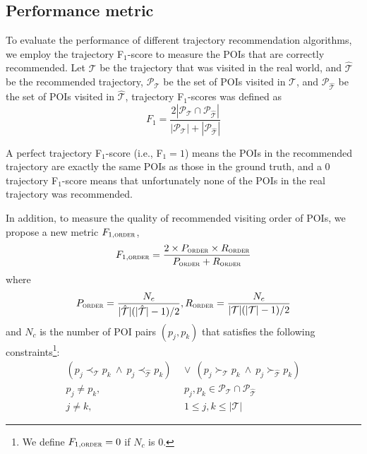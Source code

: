 \subsection{Performance metric}
\label{sec:metric}


To evaluate the performance of different trajectory recommendation algorithms,
we employ the trajectory F$_1$-score\cite{ijcai15} to measure the POIs that are
correctly recommended. Let $\mathcal{T}$ be the trajectory that was visited in the real world,
and $\hat{\mathcal{T}}$ be the recommended trajectory,
$\mathcal{P}_{\mathcal{T}}$ be the set of POIs visited in $\mathcal{T}$,
and $\mathcal{P}_{\hat{\mathcal{T}}}$ be the set of POIs visited in $\hat{\mathcal{T}}$,
trajectory F$_1$-scores was defined as
\begin{displaymath}
    F_1 = \frac{2 |\mathcal{P}_{\mathcal{T}} \cap \mathcal{P}_{\hat{\mathcal{T}}}|}
               {|\mathcal{P}_{\mathcal{T}}| + |\mathcal{P}_{\hat{\mathcal{T}}}|}
\end{displaymath}

A perfect trajectory F$_1$-score (i.e., F$_1 = 1$) means the POIs in the recommended trajectory are exactly
the same POIs as those in the ground truth, and a $0$ trajectory F$_1$-score means that unfortunately none of
the POIs in the real trajectory was recommended.

In addition, to measure the quality of recommended visiting order of POIs,
we propose a new metric $F_{1,\textsc{order}}$,
\begin{displaymath}
F_{1,\textsc{order}} = \frac{2 \times P_{\textsc{order}} \times R_{\textsc{order}}}
                           {P_{\textsc{order}} + R_{\textsc{order}}}
\end{displaymath}
where
\begin{displaymath}
P_{\textsc{order}} = \frac{N_c} {|\hat{\mathcal{T}}|(|\hat{\mathcal{T}}|-1) / 2},
R_{\textsc{order}} = \frac{N_c} {|\mathcal{T}|(|\mathcal{T}|-1) / 2}
\end{displaymath}
and $N_c$ is the number of POI pairs $(p_j, p_k)$ that satisfies the following
constraints\footnote{We define $F_{1,\textsc{order}}=0$ if $N_c$ is $0$.}:
\begin{align*}
    (p_j \prec_{\mathcal{T}} p_k ~\land~ p_j \prec_{\hat{\mathcal{T}}} p_k) & ~\lor~
    (p_j \succ_{\mathcal{T}} p_k ~\land~ p_j \succ_{\hat{\mathcal{T}}} p_k) \\
    p_j \ne p_k, &~~ p_j, p_k \in \mathcal{P}_{\mathcal{T}} \cap \mathcal{P}_{\hat{\mathcal{T}}} \\
    j \ne k, &~~ 1 \le j, k \le |\mathcal{T}|
\end{align*}


